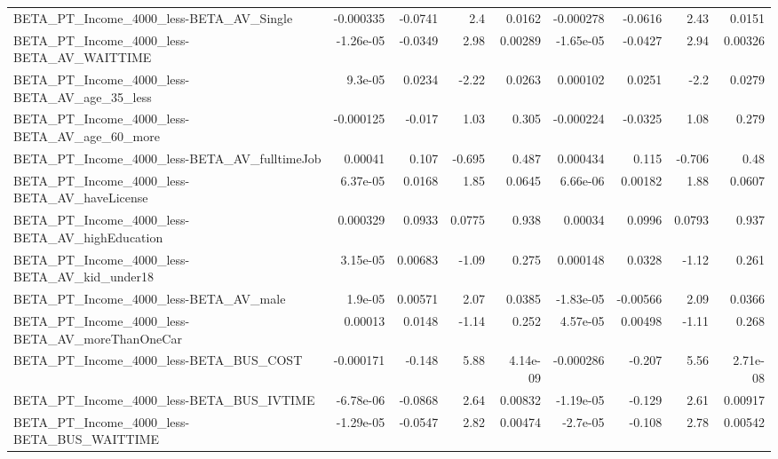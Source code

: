\begin{tabular}{lrrrrrrrr}
BETA\_PT\_Income\_4000\_less-BETA\_AV\_Single            &   -0.000335 &      -0.0741 &       2.4 &   0.0162 &  -0.000278 &     -0.0616 &         2.43 &        0.0151 \\
BETA\_PT\_Income\_4000\_less-BETA\_AV\_WAITTIME          &   -1.26e-05 &      -0.0349 &      2.98 &  0.00289 &  -1.65e-05 &     -0.0427 &         2.94 &       0.00326 \\
BETA\_PT\_Income\_4000\_less-BETA\_AV\_age\_35\_less       &     9.3e-05 &       0.0234 &     -2.22 &   0.0263 &   0.000102 &      0.0251 &         -2.2 &        0.0279 \\
BETA\_PT\_Income\_4000\_less-BETA\_AV\_age\_60\_more       &   -0.000125 &       -0.017 &      1.03 &    0.305 &  -0.000224 &     -0.0325 &         1.08 &         0.279 \\
BETA\_PT\_Income\_4000\_less-BETA\_AV\_fulltimeJob       &     0.00041 &        0.107 &    -0.695 &    0.487 &   0.000434 &       0.115 &       -0.706 &          0.48 \\
BETA\_PT\_Income\_4000\_less-BETA\_AV\_haveLicense       &    6.37e-05 &       0.0168 &      1.85 &   0.0645 &   6.66e-06 &     0.00182 &         1.88 &        0.0607 \\
BETA\_PT\_Income\_4000\_less-BETA\_AV\_highEducation     &    0.000329 &       0.0933 &    0.0775 &    0.938 &    0.00034 &      0.0996 &       0.0793 &         0.937 \\
BETA\_PT\_Income\_4000\_less-BETA\_AV\_kid\_under18       &    3.15e-05 &      0.00683 &     -1.09 &    0.275 &   0.000148 &      0.0328 &        -1.12 &         0.261 \\
BETA\_PT\_Income\_4000\_less-BETA\_AV\_male              &     1.9e-05 &      0.00571 &      2.07 &   0.0385 &  -1.83e-05 &    -0.00566 &         2.09 &        0.0366 \\
BETA\_PT\_Income\_4000\_less-BETA\_AV\_moreThanOneCar    &     0.00013 &       0.0148 &     -1.14 &    0.252 &   4.57e-05 &     0.00498 &        -1.11 &         0.268 \\
BETA\_PT\_Income\_4000\_less-BETA\_BUS\_COST             &   -0.000171 &       -0.148 &      5.88 & 4.14e-09 &  -0.000286 &      -0.207 &         5.56 &      2.71e-08 \\
BETA\_PT\_Income\_4000\_less-BETA\_BUS\_IVTIME           &   -6.78e-06 &      -0.0868 &      2.64 &  0.00832 &  -1.19e-05 &      -0.129 &         2.61 &       0.00917 \\
BETA\_PT\_Income\_4000\_less-BETA\_BUS\_WAITTIME         &   -1.29e-05 &      -0.0547 &      2.82 &  0.00474 &   -2.7e-05 &      -0.108 &         2.78 &       0.00542 \\

\end{tabular}
